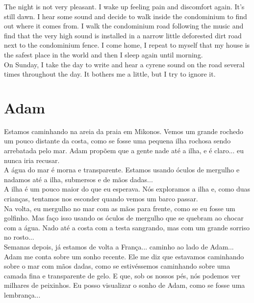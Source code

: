 \documentclass[11pt]{book}
\begin{document}
The night is not very pleasant. I wake up feeling pain and discomfort again. It's still dawn. I hear some sound and decide to walk inside the condominium to find out where it comes from. I walk the condominium road following the music and find that the very high sound is installed in a narrow little deforested dirt road next to the condominium fence. I come home, I repeat to myself that my house is the safest place in the world and then I sleep again until morning. \\

On Sunday, I take the day to write and hear a cyrene sound on the road several times throughout the day. It bothers me a little, but I try to ignore it.

\chapter{Adam}

Estamos caminhando na areia da praia em Mikonos. Vemos um grande rochedo um pouco distante da costa, como se fosse uma pequena ilha rochosa sendo arrebatada pelo mar. Adam propõem que a gente nade até a ilha, e é claro... eu nunca iria recusar. \\

A água do mar é morna e transparente. Estamos usando óculos de mergulho e nadamos até a ilha, submersos e de mãos dadas... \\

A ilha é um pouco maior do que eu esperava. Nós exploramos a ilha e, como duas crianças, tentamos nos esconder quando vemos um barco passar. \\

Na volta, eu mergulho no mar com as mãos para frente, como se eu fosse um golfinho. Mas faço isso usando os óculos de mergulho que se quebram ao chocar com a água. Nado até a costa com a testa sangrando, mas com um grande sorriso no rosto... \\

Semanas depois, já estamos de volta a França... caminho ao lado de Adam... \\

Adam me conta sobre um sonho recente. Ele me diz que estavamos caminhando sobre o mar com mãos dadas, como se estivéssemos caminhando sobre uma camada fina e transparente de gelo. E que, sob os nossos pés, nós podemos ver milhares de peixinhos. Eu posso visualizar o sonho de Adam, como se fosse uma lembrança... \\
\end{document}
